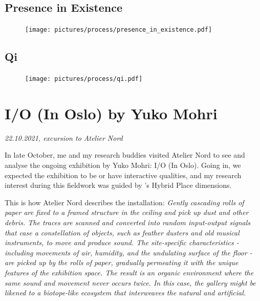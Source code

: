 \subsection{Presence in Existence}

\begin{figure}[H]
\texttt{[image: pictures/process/presence\_in\_existence.pdf]}
\caption{}
\centering 
\end{figure}

\subsection{Qi}

\begin{figure}[H]
\texttt{[image: pictures/process/qi.pdf]}
\caption{}
\centering 
\end{figure}


\section{I/O (In Oslo) by Yuko Mohri}
\par
\emph{22.10.2021, excursion to Atelier Nord}
\par

In late October, me and my research buddies visited Atelier Nord to see and analyse the ongoing exhibition by Yuko Mohri: I/O (In Oslo). Going in, we expected the exhibition to be or have interactive qualities, and my research interest during this fieldwork was guided by \autocite{hybridplace_ciolfi}'s Hybrid Place dimensions. 

This is how Atelier Nord describes the installation: 
\emph{Gently cascading rolls of paper are fixed to a framed structure in the ceiling and pick up dust and other debris. The traces are scanned and converted into random input-output signals that case a constellation of objects, such as feather dusters and old musical instruments, to move and produce sound. The site-specific characteristics - including movements of air, humidity, and the undulating surface of the floor - are picked up by the rolls of paper, gradually permeating it with the unique features of the exhibition space. The result is an organic environment where the same sound and movement never occurs twice. In this case, the gallery might be likened to a biotope-like ecosystem that interweaves the natural and artificial.} \autocite{yukomohri_web}

